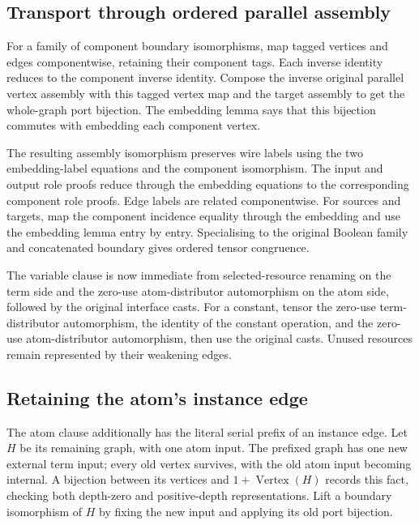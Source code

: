 \subsection{Transport through ordered parallel assembly}
For a family of component boundary isomorphisms, map tagged vertices and edges
componentwise, retaining their component tags. Each inverse identity reduces
to the component inverse identity. Compose the inverse original parallel
vertex assembly with this tagged vertex map and the target assembly to get
the whole-graph port bijection. The embedding lemma says that this bijection
commutes with embedding each component vertex.


The resulting assembly isomorphism preserves wire labels using the two
embedding-label equations and the component isomorphism. The input and output
role proofs reduce through the embedding equations to the corresponding
component role proofs. Edge labels are related componentwise. For sources
and targets, map the component incidence equality through the embedding and
use the embedding lemma entry by entry. Specialising to the original Boolean
family and concatenated boundary gives ordered tensor congruence.


The variable clause is now immediate from selected-resource renaming on the
term side and the zero-use atom-distributor automorphism on the atom side,
followed by the original interface casts. For a constant, tensor the zero-use
term-distributor automorphism, the identity of the constant operation, and
the zero-use atom-distributor automorphism, then use the original casts.
Unused resources remain represented by their weakening edges.


\subsection{Retaining the atom's instance edge}
The atom clause additionally has the literal serial prefix of an instance
edge. Let $H$ be its remaining graph, with one atom input. The prefixed graph
has one new external term input; every old vertex survives, with the old
atom input becoming internal. A bijection between its vertices and
$1+\operatorname{Vertex}(H)$ records this fact, checking both depth-zero and
positive-depth representations. Lift a boundary isomorphism of $H$ by fixing
the new input and applying its old port bijection.

